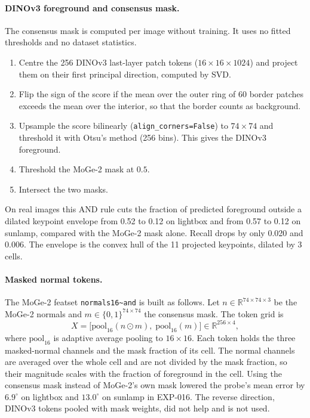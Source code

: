 \paragraph{DINOv3 foreground and consensus mask.}
The consensus mask is computed per image without training. It uses no fitted thresholds and no dataset statistics.
\begin{enumerate}
  \item Centre the 256 DINOv3 last-layer patch tokens ($16\times16\times1024$) and project them on their first principal direction, computed by SVD.
  \item Flip the sign of the score if the mean over the outer ring of 60 border patches exceeds the mean over the interior, so that the border counts as background.
  \item Upsample the score bilinearly (\texttt{align\_corners=False}) to $74\times74$ and threshold it with Otsu's method (256 bins). This gives the DINOv3 foreground.
  \item Threshold the MoGe-2 mask at $0.5$.
  \item Intersect the two masks.
\end{enumerate}
On real images this AND rule cuts the fraction of predicted foreground outside a dilated keypoint envelope from 0.52 to 0.12 on lightbox and from 0.57 to 0.12 on sunlamp, compared with the MoGe-2 mask alone. Recall drops by only 0.020 and 0.006. The envelope is the convex hull of the 11 projected keypoints, dilated by 3 cells.

\paragraph{Masked normal tokens.}
The MoGe-2 featset \texttt{normals16\textasciitilde and} is built as follows. Let $n\in\mathbb{R}^{74\times74\times3}$ be the MoGe-2 normals and $m\in\{0,1\}^{74\times74}$ the consensus mask. The token grid is
\begin{equation}
  X=\big[\mathrm{pool}_{16}(n\odot m),\;\mathrm{pool}_{16}(m)\big]\in\mathbb{R}^{256\times4},
\end{equation}
where $\mathrm{pool}_{16}$ is adaptive average pooling to $16\times16$. Each token holds the three masked-normal channels and the mask fraction of its cell. The normal channels are averaged over the whole cell and are not divided by the mask fraction, so their magnitude scales with the fraction of foreground in the cell. Using the consensus mask instead of MoGe-2's own mask lowered the probe's mean error by $6.9^\circ$ on lightbox and $13.0^\circ$ on sunlamp in EXP-016. The reverse direction, DINOv3 tokens pooled with mask weights, did not help and is not used.

